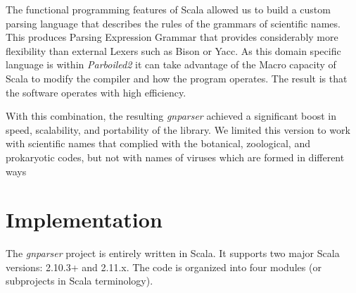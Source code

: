 \documentclass{bmcart}
\begin{document}
The functional programming features of Scala allowed us to build a custom
parsing language that describes the rules of the grammars of scientific names.
This produces Parsing Expression Grammar that provides considerably more
flexibility than external Lexers such as Bison or Yacc. As this domain specific
language is within \textit{Parboiled2} it can take advantage of the Macro
capacity of Scala \cite{Burmako:2013:SML:2489837.2489840} to modify the
compiler and how the program operates. The result is that the software operates
with high efficiency.

With this combination, the resulting \textit{gnparser} achieved a significant
boost in speed, scalability, and portability of the library.  We limited this
version to work with scientific names that complied with the botanical,
zoological, and prokaryotic codes, but not with names of viruses which are
formed in different ways \cite{ICTV, Patterson:inpress-a}

\section*{Implementation}

The \textit{gnparser} project is entirely written in Scala. It supports two
major Scala versions: 2.10.3+ and 2.11.x. The code is organized into four
modules (or subprojects in Scala terminology).
\end{document}
